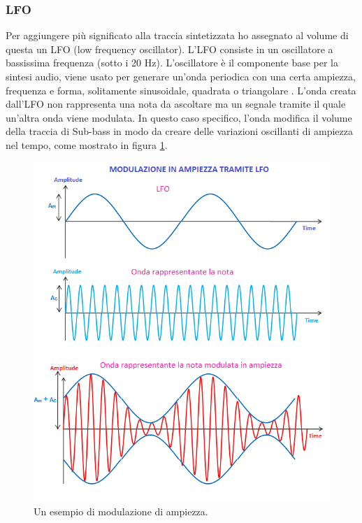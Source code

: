 \subsubsection{LFO}
Per aggiungere più significato alla traccia sintetizzata ho assegnato al volume di questa un LFO (low frequency oscillator).
L'LFO consiste in un oscillatore a bassissima frequenza (sotto i 20 Hz). L'oscillatore è il componente base per la sintesi audio, viene usato per generare un'onda periodica con una certa ampiezza, frequenza e forma, solitamente sinusoidale, quadrata o triangolare \cite{}.
L'onda creata dall'LFO non rappresenta una nota da ascoltare ma un segnale tramite il quale un'altra onda viene modulata.
In questo caso specifico, l'onda modifica il volume della traccia di Sub-bass in modo da creare delle variazioni oscillanti di ampiezza nel tempo, come mostrato in figura \ref{fig:lfo}.
\begin{figure}[H]
    \includegraphics[width=\linewidth]{img/lfo.png}
    \caption{Un esempio di modulazione di ampiezza.}
    \label{fig:lfo}
\end{figure}

